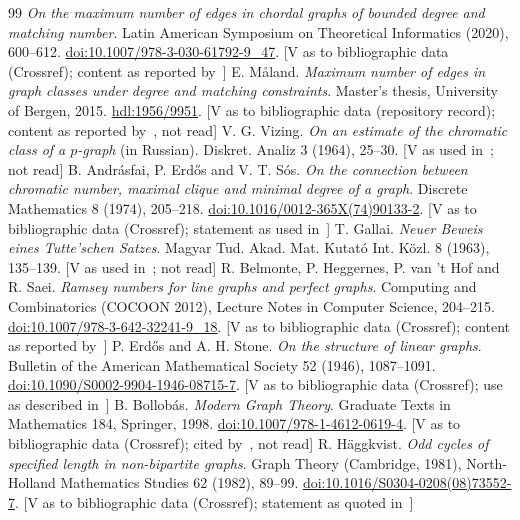 \documentclass[11pt]{article}
\theoremstyle{remark}
\begin{document}
\begin{thebibliography}{99}
\emph{On the maximum number of edges in chordal graphs of bounded degree and matching number}.
Latin American Symposium on Theoretical Informatics (2020), 600--612.
\href{https://doi.org/10.1007/978-3-030-61792-9_47}{doi:10.1007/978-3-030-61792-9\_47}. [V as to bibliographic data (Crossref); content as reported by~\cite{AEY}]
 E. M\aa land.
\emph{Maximum number of edges in graph classes under degree and matching constraints}.
Master's thesis, University of Bergen, 2015.
\href{https://hdl.handle.net/1956/9951}{hdl:1956/9951}. [V as to bibliographic data (repository record); content as reported by~\cite{AEY}, not read]
 V. G. Vizing.
\emph{On an estimate of the chromatic class of a $p$-graph} (in Russian).
Diskret. Analiz 3 (1964), 25--30. [V as used in~\cite{AEY}; not read]
 B. Andr\'asfai, P. Erd\H{o}s and V. T. S\'os.
\emph{On the connection between chromatic number, maximal clique and minimal degree of a graph}.
Discrete Mathematics 8 (1974), 205--218.
\href{https://doi.org/10.1016/0012-365X(74)90133-2}{doi:10.1016/0012-365X(74)90133-2}. [V as to bibliographic data (Crossref); statement as used in~\cite{AEY}]
 T. Gallai.
\emph{Neuer Beweis eines Tutte'schen Satzes}.
Magyar Tud. Akad. Mat. Kutat\'o Int. K\"ozl. 8 (1963), 135--139. [V as used in~\cite{AEY}; not read]
 R. Belmonte, P. Heggernes, P. van 't Hof and R. Saei.
\emph{Ramsey numbers for line graphs and perfect graphs}.
Computing and Combinatorics (COCOON 2012), Lecture Notes in Computer Science, 204--215.
\href{https://doi.org/10.1007/978-3-642-32241-9_18}{doi:10.1007/978-3-642-32241-9\_18}. [V as to bibliographic data (Crossref); content as reported by~\cite{AEY}]
 P. Erd\H{o}s and A. H. Stone.
\emph{On the structure of linear graphs}.
Bulletin of the American Mathematical Society 52 (1946), 1087--1091.
\href{https://doi.org/10.1090/S0002-9904-1946-08715-7}{doi:10.1090/S0002-9904-1946-08715-7}. [V as to bibliographic data (Crossref); use as described in~\cite{AEY}]
 B. Bollob\'as.
\emph{Modern Graph Theory}.
Graduate Texts in Mathematics 184, Springer, 1998.
\href{https://doi.org/10.1007/978-1-4612-0619-4}{doi:10.1007/978-1-4612-0619-4}. [V as to bibliographic data (Crossref); cited by~\cite{AEY}, not read]
 R. H\"aggkvist.
\emph{Odd cycles of specified length in non-bipartite graphs}.
Graph Theory (Cambridge, 1981), North-Holland Mathematics Studies 62 (1982), 89--99.
\href{https://doi.org/10.1016/S0304-0208(08)73552-7}{doi:10.1016/S0304-0208(08)73552-7}. [V as to bibliographic data (Crossref); statement as quoted in~\cite{AEY}]

\end{thebibliography}
\end{document}
